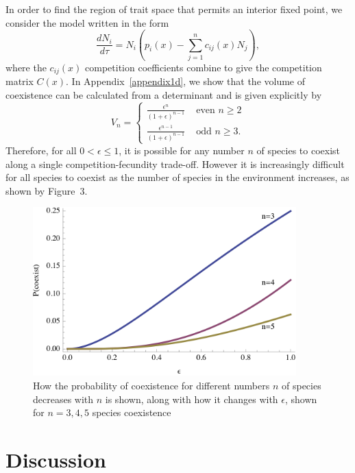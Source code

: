 In order to find the region of trait space that permits an interior fixed point, we consider the model written in the form
\begin{equation}
\frac{dN_i}{d\tau}=N_i\left(p_i(x) - \sum_{j=1}^n c_{ij}(x)N_j\right),
\end{equation}
where the $c_{ij}(x)$ competition coefficients combine to give the competition matrix $C(x)$. In Appendix~\ref{appendix1d}, we show that the volume of coexistence can be calculated from a determinant and is given explicitly by
\[
V_{n}=
\left\{
\begin{array}{rl}
\frac{\epsilon^{n}}{(1+\epsilon)^{n-1}} & \mbox{ even }n\geq 2\\
\frac{\epsilon^{n-1}}{(1+\epsilon)^{n-1}} & \mbox{ odd }n\geq 3. 
\end{array} \right.
\]
Therefore, for all $0<\epsilon \leq1$, it is possible for any number $n$ of species to coexist along a single competition-fecundity trade-off. However it is increasingly difficult for all species to coexist as the number of species in the environment increases, as shown by Figure~3.

\begin{figure}[htbp]
   \centering
   \includegraphics[width=4in]{Figure3}
   \caption[Change of probability of coexistence as number of species increases]{How the probability of coexistence for different numbers $n$ of species decreases with $n$ is shown, along with how it changes with $\epsilon$, shown for $n=3,4,5$ species coexistence}
   \label{fig:ndif}
\end{figure}


\section{Discussion}

